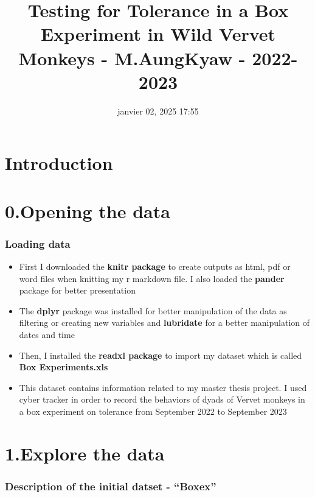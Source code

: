 \documentclass[
]{article}
\title{Testing for Tolerance in a Box Experiment in Wild Vervet Monkeys
- M.AungKyaw - 2022-2023}
\author{}
\date{\vspace{-2.5em}janvier 02, 2025 17:55}
\providecommand{\tightlist}{%
  \setlength{\itemsep}{0pt}\setlength{\parskip}{0pt}}
\begin{document}
\maketitle

{
\setcounter{tocdepth}{6}
\tableofcontents
}
\hypertarget{introduction}{%
\section{Introduction}\label{introduction}}

\hypertarget{opening-the-data}{%
\section{0.Opening the data}\label{opening-the-data}}

\hypertarget{loading-data}{%
\subsubsection{Loading data}\label{loading-data}}

\begin{itemize}
\tightlist
\item
  First I downloaded the \textbf{knitr package} to create outputs as
  html, pdf or word files when knitting my r markdown file. I also
  loaded the \textbf{pander} package for better presentation
\item
  The \textbf{dplyr} package was installed for better manipulation of
  the data as filtering or creating new variables and \textbf{lubridate}
  for a better manipulation of dates and time
\item
  Then, I installed the \textbf{readxl package} to import my dataset
  which is called \textbf{Box Experiments.xls}
\item
  This dataset contains information related to my master thesis project.
  I used cyber tracker in order to record the behaviors of dyads of
  Vervet monkeys in a box experiment on tolerance from September 2022 to
  September 2023
\end{itemize}

\hypertarget{explore-the-data}{%
\section{1.Explore the data}\label{explore-the-data}}

\hypertarget{description-of-the-initial-datset---boxex}{%
\subsubsection{Description of the initial datset -
``Boxex''}\label{description-of-the-initial-datset---boxex}}
\end{document}
